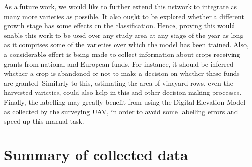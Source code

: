 As a future work, we would like to further extend this network to integrate as many more varieties as possible. It also ought to be explored whether a different growth stage has some effects on the classification. Hence, proving this would enable this work to be used over any study area at any stage of the year as long as it comprises some of the varieties over which the model has been trained. Also, a considerable effort is being made to collect information about crops receiving grants from national and European funds. For instance, it should be inferred whether a crop is abandoned or not to make a decision on whether these funds are granted. Similarly to this, estimating the area of vineyard rows, even the harvested varieties, could also help in this and other decision-making processes. Finally, the labelling may greatly benefit from using the Digital Elevation Model as collected by the surveying UAV, in order to avoid some labelling errors and speed up this manual task. 

\section{Summary of collected data}

